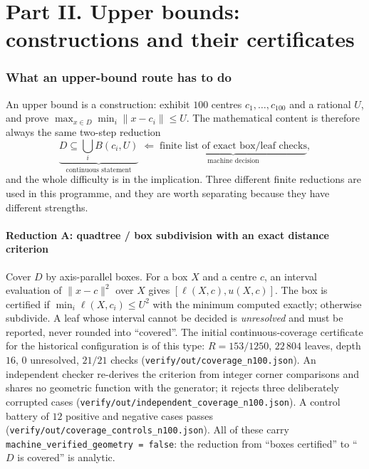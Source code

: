 \part*{Part II. Upper bounds: constructions and their certificates}
\setcounter{section}{0}

\section{What an upper-bound route has to do}

An upper bound is a construction: exhibit $100$ centres $c_1,\dots,c_{100}$ and a rational $U$, and
prove $\max_{x\in D}\min_i\|x-c_i\|\le U$. The mathematical content is therefore always the same
two-step reduction
\[
\underbrace{D\subseteq\bigcup_i B(c_i,U)}_{\text{continuous statement}}
\;\Longleftarrow\;
\underbrace{\text{finite list of exact box/leaf checks}}_{\text{machine decision}} ,
\]
and the whole difficulty is in the implication. Three different finite reductions are used in this
programme, and they are worth separating because they have different strengths.

\subsection{Reduction A: quadtree / box subdivision with an exact distance criterion}

Cover $D$ by axis-parallel boxes. For a box $X$ and a centre $c$, an interval evaluation of
$\|x-c\|^2$ over $X$ gives $[\ell(X,c),u(X,c)]$. The box is certified if
$\min_i \ell(X,c_i)\le U^2$ with the minimum computed exactly; otherwise subdivide. A leaf whose
interval cannot be decided is \emph{unresolved} and must be reported, never rounded into
``covered''. The initial continuous-coverage certificate for the historical configuration is of
this type: $R=153/1250$, $22\,804$ leaves, depth $16$, $0$ unresolved, $21/21$ checks
(\texttt{verify/\allowbreak{}out/\allowbreak{}coverage\_\allowbreak{}n100.json}). An independent checker re-derives the criterion from
integer corner comparisons and shares no geometric function with the generator; it rejects three
deliberately corrupted cases (\texttt{verify/\allowbreak{}out/\allowbreak{}independent\_\allowbreak{}coverage\_\allowbreak{}n100.json}). A control
battery of $12$ positive and negative cases passes
(\texttt{verify/\allowbreak{}out/\allowbreak{}coverage\_\allowbreak{}controls\_\allowbreak{}n100.json}). All of these carry
\texttt{machine\_\allowbreak{}verified\_\allowbreak{}geometry = false}: the reduction from ``boxes certified'' to ``$D$ is
covered'' is analytic.

